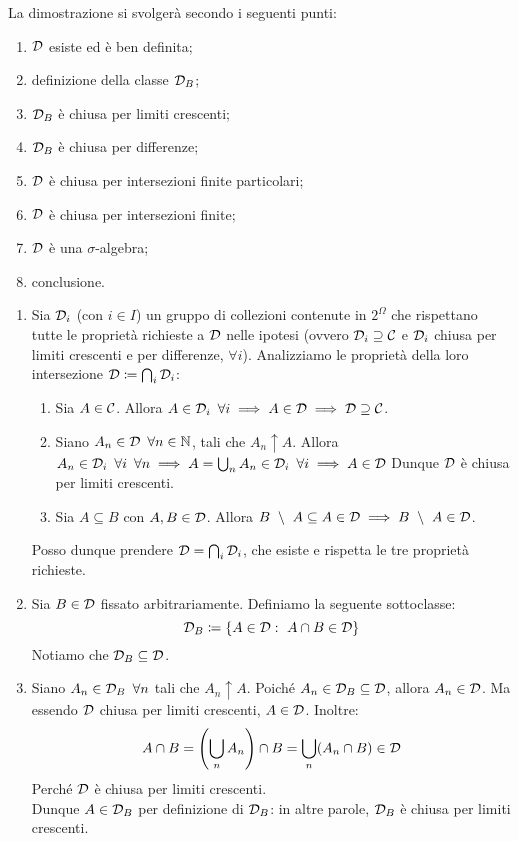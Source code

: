 \medskip
\begin{dimo}
La dimostrazione si svolgerà secondo i seguenti punti:
\begin{enumerate}
  \item $\mathcal D$ esiste ed è ben definita;
  \item definizione della classe $\mathcal D_B$;
  \item $\mathcal D_B$ è chiusa per limiti crescenti;
  \item $\mathcal D_B$ è chiusa per differenze;
  \item $\mathcal D$ è chiusa per intersezioni finite particolari;
  \item $\mathcal D$ è chiusa per intersezioni finite;
  \item $\mathcal D$ è una $\sigma$-algebra;
  \item conclusione.

\end{enumerate}
\medskip
\begin{enumerate}
  \item Sia $\mathcal D_i$ (con $i \in I$) un gruppo di collezioni contenute in $2^\Omega$ che rispettano tutte le proprietà richieste a $\mathcal D$ nelle ipotesi (ovvero $\mathcal D_i \supseteq \mathcal C$ e $\mathcal D_i$ chiusa per limiti crescenti e per differenze, $\forall i$). Analizziamo le proprietà della loro intersezione $\mathcal D \coloneqq \bigcap_i \mathcal D_i$:
  \begin{enumerate}
    \item Sia $A \in \mathcal C$. Allora $A \in \mathcal D_i \enspace \forall i \implies A \in \mathcal D \implies \mathcal D \supseteq \mathcal C$.
    \item Siano $A_n \in \mathcal D \enspace \forall n \in \mathbb N$, tali che $A_n \uparrow A$. Allora $ A_n \in \mathcal D_i \enspace \forall i \enspace \forall n \implies A = \bigcup_n A_n \in \mathcal D_i \enspace \forall i \implies A \in \mathcal D$
  Dunque $\mathcal D$ è chiusa per limiti crescenti.
    \item Sia $A \subseteq B$ con $A,B \in \mathcal D$. Allora $B \ \setminus \ A \subseteq A \in \Dc \implies B \ \setminus \ A \in \Dc$.
  \end{enumerate}
  Posso dunque prendere $\mathcal D = \bigcap_i \mathcal D_i$, che esiste e rispetta le tre proprietà richieste.
  \item Sia $B \in \mathcal D$ fissato arbitrariamente.
  Definiamo la seguente sottoclasse:
  $$ \mathcal D_B \coloneqq \left \{ A \in \mathcal D: \ A \cap B \in \mathcal D \right \}$$
  Notiamo che $\mathcal D_B \subseteq \mathcal D$.
  \item Siano $A_n \in \mathcal D_B \enspace \forall n$ tali che $A_n \uparrow A$.
  Poiché $A_n \in \mathcal D_B \subseteq \mathcal D$, allora $A_n \in \mathcal D$. Ma essendo $\mathcal D$ chiusa per limiti crescenti, $A \in \mathcal D$. Inoltre:
  $$A \cap B = \left(\bigcup_n A_n\right) \cap B = \bigcup_n(A_n \cap B) \in \mathcal D$$
  Perché $\mathcal D$ è chiusa per limiti crescenti. \\
  Dunque $A \in \mathcal D_B$ per definizione di $\mathcal D_B$: in altre parole, $\mathcal D_B$ è chiusa per limiti crescenti.


\end{enumerate}
\end{dimo}

